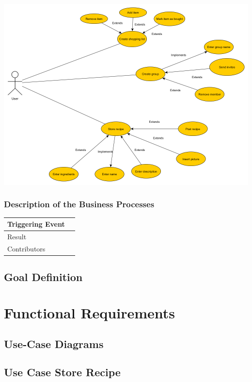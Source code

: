 \documentclass[12pt]{article}
\theoremstyle{definition}
\begin{document}
\includegraphics[scale=.5]{UseCase.png}

\subsubsection{Description of the Business Processes}

\begin{tabular}{|l|l|}
\hline
Triggering Event &  \\ \hline
Result &  \\ \hline
Contributors &  \\ \hline
\end{tabular}

\subsection{Goal Definition}

\pagebreak

\section{Functional Requirements}

\subsection{Use-Case Diagrams}

\subsection{Use Case Store Recipe}
\end{document}
